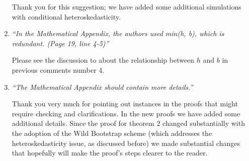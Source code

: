 \documentclass[12pt,fleqn]{article}
\begin{document}
\begin{enumerate}
  Thank you for this suggestion; we have added some additional simulations with conditional heteroskedasticity.

\item \textit{``In the Mathematical Appendix, the authors used min(h, b), which is redundant. (Page 19, line 4-5)''}

Please see the discussion to about the relationship between $h$ and $b$ in previous comments number 4.

\item \textit{``The Mathematical Appendix should contain more details.''}

Thank you very much for pointing out instances in the proofs that might require checking and clarifications. In the new proofs we have added some additional details. Since the proof for theorem 2 changed substantially with the adoption of the Wild Bootstrap scheme (which addresses the heteroskedasticity issue, as discussed before) we made substantial changes that hopefully will make the proof's steps clearer to the reader.

\end{enumerate}
\end{document}
